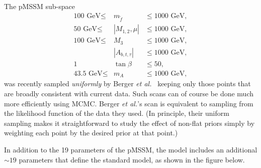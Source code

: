The pMSSM sub-space
\begin{eqnarray}
  \mbox{100 GeV} \leq 	& m_{\tilde{f}} 	& \leq \mbox{1000 GeV}, 	
  \\ \nonumber
  \mbox{50 GeV}  \leq	& |M_{1,2},\mu| & \leq \mbox{1000 GeV}, 	
    \\ \nonumber
    \mbox{100 GeV} \leq	& M_3 		& \leq  \mbox{1000 GeV},
    \\ \nonumber
	& |A_{b,t,\tau}| & \leq \mbox{1000 GeV}, 		
    \\ \nonumber
    1					& \tan\beta		& \leq 50,				
    \\ \nonumber
    \mbox{43.5 GeV}	\leq	& m_A			& \leq \mbox{1000 GeV},
\end{eqnarray}
was recently sampled \emph{uniformly} by Berger \emph{et al.}~\cite{pMSSM1} 
keeping only those
points that are broadly consistent with current data. Such
scans can of course be done much more efficiently using MCMC.
Berger \emph{et al.}'s scan is equivalent to sampling from the
likelihood function of the data they used. 
(In principle, their uniform sampling  makes it straightforward
to study the effect of non-flat
priors simply by 
weighting each point by the desired prior at that point.) 

\newpage
In addition to the 19 parameters of the pMSSM, the model includes an
additional $\sim 19$ parameters that define the standard
model, as shown in the figure below.

\bigskip
\bigskip
